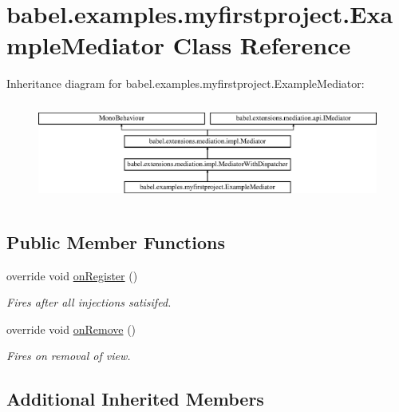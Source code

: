 \hypertarget{classbabel_1_1examples_1_1myfirstproject_1_1_example_mediator}{\section{babel.\-examples.\-myfirstproject.\-Example\-Mediator Class Reference}
\label{classbabel_1_1examples_1_1myfirstproject_1_1_example_mediator}
}
Inheritance diagram for babel.\-examples.\-myfirstproject.\-Example\-Mediator\-:\begin{figure}[H]
\begin{center}
\leavevmode
\includegraphics[height=3.333333cm]{classbabel_1_1examples_1_1myfirstproject_1_1_example_mediator}
\end{center}
\end{figure}
\subsection*{Public Member Functions}
\begin{DoxyCompactItemize}
\item 
override void \hyperlink{classbabel_1_1examples_1_1myfirstproject_1_1_example_mediator_abe56f9c8c8ab58eb281a27369b7e65b9}{on\-Register} ()
\begin{DoxyCompactList}\small\item\em Fires after all injections satisifed. \end{DoxyCompactList}\item 
override void \hyperlink{classbabel_1_1examples_1_1myfirstproject_1_1_example_mediator_ac6b3b96cc9b4e5532e7b34ed278eb1ac}{on\-Remove} ()
\begin{DoxyCompactList}\small\item\em Fires on removal of view. \end{DoxyCompactList}\end{DoxyCompactItemize}
\subsection*{Additional Inherited Members}


